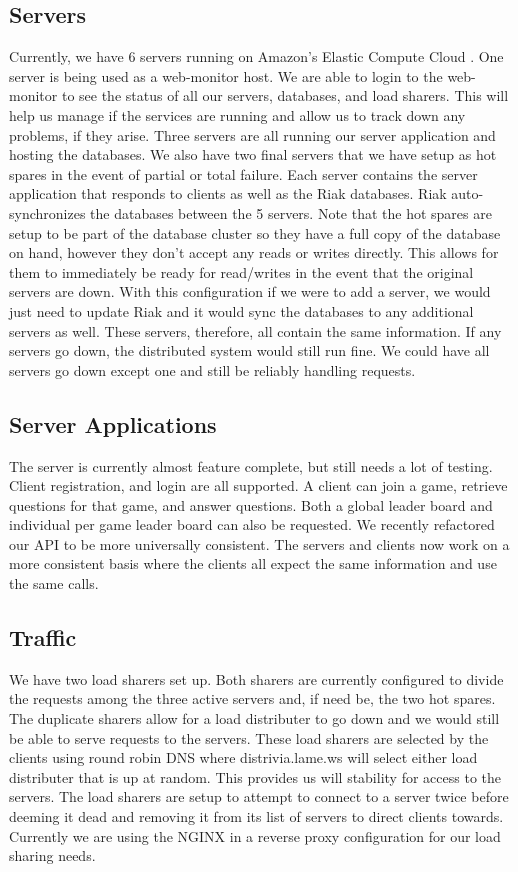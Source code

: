 \documentclass{dependencies/acm_proc_article-sp}
\begin{document}
\subsection {Servers}
Currently, we have 6 servers running on Amazon's Elastic Compute Cloud \cite{aec}. One server is being used as a web-monitor
host. We are able to login to the web-monitor to see the status of all our
servers, databases, and load sharers. This will help us manage if the services
are running and allow us to track down any problems, if they arise. Three
servers are all running our server application and hosting the databases.
We also have two final servers that we have setup as hot spares in the event
of partial or total failure.
Each server contains the server application that responds to clients as well as
the Riak \cite{riak} databases. Riak auto-synchronizes the databases between the 5 servers.
Note that the hot spares are setup to be part of the database cluster so they
have a full copy of the database on hand, however they don't accept any reads
or writes directly. This allows for them to immediately be ready for read/writes in the event that the original servers are down.
With this configuration if we were to add a server, we would just need to update 
Riak and it would sync the databases to any additional servers as well. These servers,
therefore, all contain the same information. If any servers go down, the distributed
system would still run fine. We could have all servers go down except one and still
be reliably handling requests.

\subsection {Server Applications}
The server is currently almost feature complete, but still needs a lot of
testing. Client registration, and login are all supported. A client can
join a game, retrieve questions for that game, and answer questions. Both a
global leader board and individual per game leader board can also be requested.
We recently refactored our API to be more universally consistent.
The servers and clients now work on a more consistent basis where the clients all expect the same information and use the same calls.

\subsection {Traffic}
We have two load sharers set up. Both sharers are currently configured to
divide the requests among the three active servers and, if need be, the two hot spares. The duplicate sharers allow
for a load distributer to go down and we would still be able to serve requests
to the servers. These load sharers are selected by the clients using round
robin DNS where distrivia.lame.ws will select either load distributer that is
up at random. This provides us will stability for access to the servers. The
load sharers are setup to attempt to connect to a server twice before
deeming it dead and removing it from its list of servers to direct clients towards.
Currently we are using the NGINX \cite{nginx} in a reverse proxy configuration
for our load sharing needs.
\end{document}
